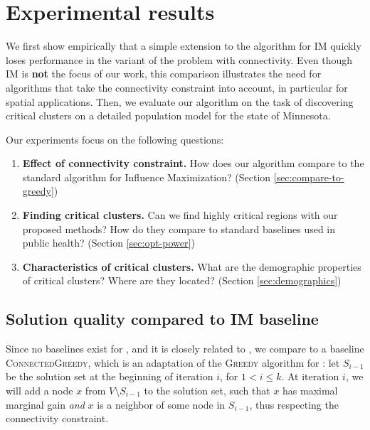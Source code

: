 \section{Experimental results}
\label{sec:experiments-cs}
We first show empirically that a simple extension to the algorithm for IM quickly loses performance in the variant of the problem with connectivity. Even though IM is \textbf{not} the focus of our work, this comparison illustrates the need for algorithms that take the connectivity constraint into account, in particular for spatial applications. Then, we evaluate our algorithm on the task of discovering critical clusters on a detailed population model for the state of Minnesota.

Our experiments focus on the following questions:
\begin{enumerate}
\item \textbf{Effect of connectivity constraint.} How does our algorithm compare to the standard algorithm for Influence Maximization? (Section \ref{sec:compare-to-greedy})
\item \textbf{Finding critical clusters.} Can we find highly critical regions with our proposed methods? How do they compare to standard baselines used in public health? (Section \ref{sec:opt-power})
\item \textbf{Characteristics of critical clusters.} What are the demographic properties of critical clusters? Where are they located? (Section \ref{sec:demographics})
\end{enumerate}

\subsection{Solution quality compared to IM baseline}
Since no baselines exist for \maxcrit{}, and it is closely related to \infmax{}, 
we compare \algomaxcrit{} to a baseline  \textsc{ConnectedGreedy}, which is an adaptation of the \textsc{Greedy}
algorithm for \infmax{}:
let $S_{i-1}$ be the solution set at the beginning of iteration $i$, for $1 < i \leq k$. At iteration $i$, we will add a node $x$ from $V\setminus S_{i-1}$ to the solution set, such that $x$ has maximal marginal gain \emph{and} $x$ is a neighbor of some node in $S_{i-1}$, thus respecting the connectivity constraint.

